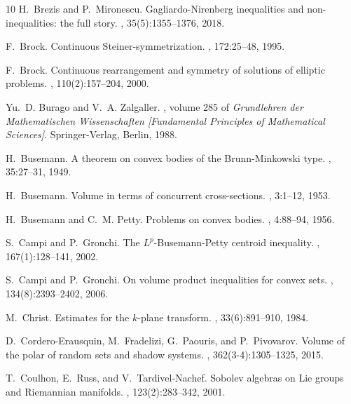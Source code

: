 \documentclass[11pt]{article}
\theoremstyle{definition}
\theoremstyle{proof}
\DeclareMathOperator{\+}{\mathop{\tilde{+}}}
\numberwithin{equation}{section}
\numberwithin{equation}{section}
\begin{document}
\begin{thebibliography}{10}
H.~Brezis and P.~Mironescu.
\newblock Gagliardo-{N}irenberg inequalities and non-inequalities: the full
  story.
,
  35(5):1355--1376, 2018.

F.~Brock.
\newblock Continuous {S}teiner-symmetrization.
, 172:25--48, 1995.

F.~Brock.
\newblock Continuous rearrangement and symmetry of solutions of elliptic
  problems.
, 110(2):157--204, 2000.

Yu.~D. Burago and V.~A. Zalgaller.
, volume 285 of {\em Grundlehren der
  Mathematischen Wissenschaften [Fundamental Principles of Mathematical
  Sciences]}.
\newblock Springer-Verlag, Berlin, 1988.

H.~Busemann.
\newblock A theorem on convex bodies of the {B}runn-{M}inkowski type.
, 35:27--31, 1949.

H.~Busemann.
\newblock Volume in terms of concurrent cross-sections.
, 3:1--12, 1953.

H.~Busemann and C.~M. Petty.
\newblock Problems on convex bodies.
, 4:88--94, 1956.

S.~Campi and P.~Gronchi.
\newblock The {$L^p$}-{B}usemann-{P}etty centroid inequality.
, 167(1):128--141, 2002.

S.~Campi and P.~Gronchi.
\newblock On volume product inequalities for convex sets.
, 134(8):2393--2402, 2006.

M.~Christ.
\newblock Estimates for the {$k$}-plane transform.
, 33(6):891--910, 1984.

D.~Cordero-Erausquin, M.~Fradelizi, G.~Paouris, and P.~Pivovarov.
\newblock Volume of the polar of random sets and shadow systems.
, 362(3-4):1305--1325, 2015.

T.~Coulhon, E.~Russ, and V.~Tardivel-Nachef.
\newblock Sobolev algebras on {L}ie groups and {R}iemannian manifolds.
, 123(2):283--342, 2001.


\end{thebibliography}
\end{document}
